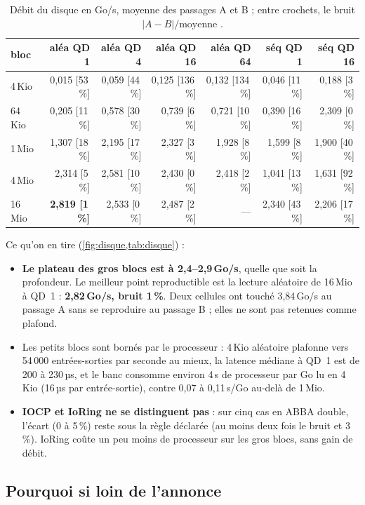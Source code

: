 \begin{table}[ht]
\centering\small
\caption[Débit du disque, extrait du balayage ABBA]{Débit du disque en Go/s, moyenne des passages A et B ; entre crochets, le bruit $|A-B|/\text{moyenne}$ \mes.}
\label{tab:disque}
\begin{tabular}{@{}lrrrrrr@{}}
\toprule
bloc & aléa QD 1 & aléa QD 4 & aléa QD 16 & aléa QD 64 & séq QD 1 & séq QD 16 \\
\midrule
4\,Kio & 0,015 [53\,\%] & 0,059 [44\,\%] & 0,125 [136\,\%] & 0,132 [134\,\%] & 0,046 [11\,\%] & 0,188 [3\,\%] \\
64\,Kio & 0,205 [11\,\%] & 0,578 [30\,\%] & 0,739 [6\,\%] & 0,721 [10\,\%] & 0,390 [16\,\%] & 2,309 [0\,\%] \\
1\,Mio & 1,307 [18\,\%] & 2,195 [17\,\%] & 2,327 [3\,\%] & 1,928 [8\,\%] & 1,599 [8\,\%] & 1,900 [40\,\%] \\
4\,Mio & 2,314 [5\,\%] & 2,581 [10\,\%] & 2,430 [0\,\%] & 2,418 [2\,\%] & 1,041 [13\,\%] & 1,631 [92\,\%] \\
16\,Mio & \textbf{2,819 [1\,\%]} & 2,533 [0\,\%] & 2,487 [2\,\%] & --- & 2,340 [43\,\%] & 2,206 [17\,\%] \\
\bottomrule
\end{tabular}
\end{table}

Ce qu'on en tire (\cref{fig:disque,tab:disque}) :
\begin{itemize}
\item \textbf{Le plateau des gros blocs est à 2,4--2,9\,Go/s}, quelle que soit la profondeur. Le meilleur point reproductible est la lecture aléatoire de 16\,Mio à QD~1 : \textbf{2,82\,Go/s, bruit 1\,\%}. Deux cellules ont touché 3,84\,Go/s au passage A sans se reproduire au passage B ; elles ne sont pas retenues comme plafond.
\item Les petits blocs sont bornés par le processeur : 4\,Kio aléatoire plafonne vers 54\,000 entrées-sorties par seconde au mieux, la latence médiane à QD~1 est de 200 à 230\,µs, et le banc consomme environ 4\,s de processeur par Go lu en 4\,Kio (16\,µs par entrée-sortie), contre 0,07 à 0,11\,s/Go au-delà de 1\,Mio.
\item \textbf{IOCP et IoRing ne se distinguent pas} : sur cinq cas en ABBA double, l'écart (0 à 5\,\%) reste sous la règle déclarée (au moins deux fois le bruit et 3\,\%). IoRing coûte un peu moins de processeur sur les gros blocs, sans gain de débit.
\end{itemize}

\subsection{Pourquoi si loin de l'annonce}

